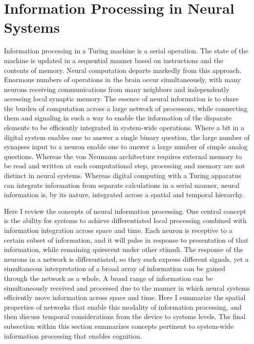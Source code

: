 \documentclass[twocolumn]{article}
\begin{document}
\section{\label{sec:neuroscience}Information Processing in Neural Systems}
Information processing in a Turing machine is a serial operation. The state of the machine is updated in a sequential manner based on instructions and the contents of memory. Neural computation departs markedly from this approach. Enormous numbers of operations in the brain occur simultaneously, with many neurons receiving communications from many neighbors and independently accessing local synaptic memory. The essence of neural information is to share the burden of computation across a large network of processors, while connecting them and signaling in such a way to enable the information of the disparate elements to be efficiently integrated in system-wide operations. Where a bit in a digital system enables one to answer a single binary question, the large number of synapses input to a neuron enable one to answer a large number of simple analog questions. Whereas the von Neumann architecture requires external memory to be read and written at each computational step, processing and memory are not distinct in neural systems. Whereas digital computing with a Turing apparatus can integrate information from separate calculations in a serial manner, neural information is, by its nature, integrated across a spatial and temporal hierarchy.

Here I review the concepts of neural information processing. One central concept is the ability for systems to achieve differentiated local processing combined with information integration across space and time. Each neuron is receptive to a certain subset of information, and it will pulse in response to presentation of that information, while remaining quiescent under other stimuli. The response of the neurons in a network is differentiated, so they each express different signals, yet a simultaneous interpretation of a broad array of information can be gained through the network as a whole. A broad range of information can be simultaneously received and processed due to the manner in which neural systems efficiently move information across space and time. Here I summarize the spatial properties of networks that enable this modality of information processing, and then discuss temporal considerations from the device to systems levels. The final subsection within this section summarizes concepts pertinent to system-wide information processing that enables cognition.
\end{document}
